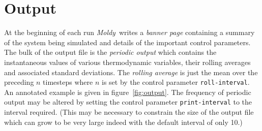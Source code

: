 \documentclass[twoside]{report}
\newcommand{\moldy}{{\em Moldy}}
\begin{document}
\section{Output}%
\label{sec:output}
At the beginning of each run \moldy\  writes a {\em banner page\/}
containing a summary of the system being simulated and details of the
important control parameters. The bulk of the output file is the {\em
periodic output\/} which contains the instantaneous values of various
thermodynamic variables, their rolling averages and associated
standard deviations. The {\em rolling average\/} is just the mean over
the preceding $n$ timesteps where $n$ is set by the control parameter
\texttt{roll-interval}.   An annotated example is given in
figure~\ref{fig:output}.  The frequency of periodic output may be
altered by setting the control parameter \texttt{print-interval} to the
interval required.  (This may be necessary to constrain the size of
the output file which can grow to be very large indeed with the
default interval of only 10.)
\end{document}
